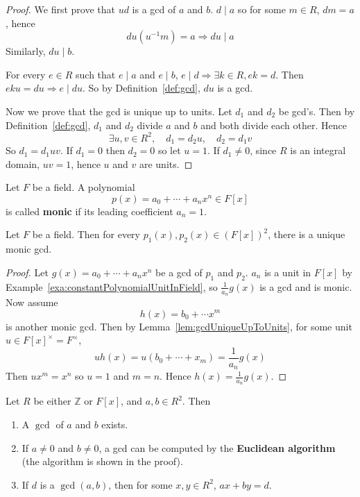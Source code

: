 \begin{proof}
	We first prove that $ud$ is a gcd of $a$ and $b$. $d \mid a$ so for some $m \in R$, $dm = a$, hence
	\[
		du (u^{-1} m) = a \Longrightarrow du \mid a
	\]
	Similarly, $du \mid b$.

	For every $e \in R$ such that $e \mid a$ and $e \mid b$, $e \mid d \Longrightarrow \exists k \in R, ek = d$. Then $eku = du \Rightarrow e \mid du$. So by Definition~\ref{def:gcd}, $du$ is a gcd.

	Now we prove that the gcd is unique up to units. Let $d_1$ and $d_2$ be gcd's. Then by Definition~\ref{def:gcd}, $d_1$ and $d_2$ divide $a$ and $b$ and both divide each other. Hence
	\[
		\exists u, v \in R^2, \quad d_1 = d_2 u, \quad d_2 = d_1 v
	\]
	So $d_1 = d_1 uv$. If $d_1 = 0$ then $d_2 = 0$ so let $u = 1$. If $d_1 \ne 0$, since $R$ is an integral domain, $uv = 1$, hence $u$ and $v$ are units.
\end{proof}

\begin{definition}
	Let $F$ be a field. A polynomial
	\[
		p(x) = a_0 + \cdots + a_n x^n \in F[x]
	\]
	is called \textbf{monic} if its leading coefficient $a_n = 1$.
\end{definition}

\begin{corollary}
	Let $F$ be a field. Then for every $p_1(x), p_2(x) \in {(F[x])}^2$, there is a unique monic gcd.
\end{corollary}

\begin{proof}
	Let $g(x) = a_0 + \cdots + a_n x^n$ be a gcd of $p_1$ and $p_2$. $a_n$ is a unit in $F[x]$ by Example~\ref{exa:constantPolynomialUnitInField}, so $\frac{1}{a_n} g(x)$ is a gcd and is monic. Now assume
	\[
		h(x) = b_0 + \cdots x^m
	\]
	is another monic gcd. Then by Lemma~\ref{lem:gcdUniqueUpToUnits}, for some unit $u \in F[x]^{\times} = F^{\times}$,
	\[
		u h(x) = u(b_0 + \cdots + x_m) = \frac{1}{a_n} g(x)
	\]
	Then $u x^m = x^n$ so $u = 1$ and $m = n$. Hence $h(x) = \frac{1}{a_n} g(x)$.
\end{proof}

\begin{theorem}\label{thm:gcdExistsAndCanBeComputed}
	Let $R$ be either $\mathbb{Z}$ or $F[x]$, and $a, b \in R^2$. Then
	\begin{enumerate}
		\item A $\gcd$ of $a$ and $b$ exists.
		\item If $a \ne 0$ and $b \ne 0$, a gcd can be computed by the \textbf{Euclidean algorithm} (the algorithm is shown in the proof).
		\item If $d$ is a $\gcd(a, b)$, then for some $x, y \in R^2$, $ax + by = d$.
	\end{enumerate}
\end{theorem}

